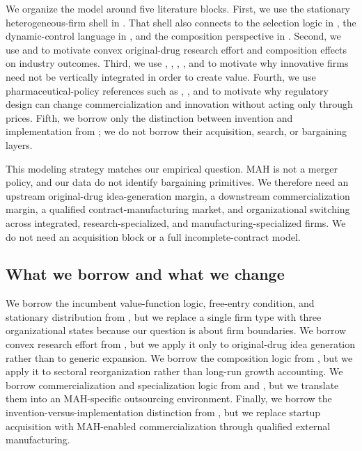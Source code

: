 \documentclass[12pt]{article}
\newcommand{\1}{\mathbf{1}}
\begin{document}
We organize the model around five literature blocks. First, we use the stationary heterogeneous-firm shell in \citet{Hopenhayn1992}. That shell also connects to the selection logic in \citet{Jovanovic1982}, the dynamic-control language in \citet{EricsonPakes1995}, and the composition perspective in \citet{Luttmer2007}. Second, we use \citet{KletteKortum2004} and \citet{AkcigitKerr2018} to motivate convex original-drug research effort and composition effects on industry outcomes. Third, we use \citet{AroraFosfuriGambardella2001}, \citet{AroraMerges2004}, \citet{GansStern2000}, \citet{GansStern2003}, and \citet{GansHsuStern2008} to motivate why innovative firms need not be vertically integrated in order to create value. Fourth, we use pharmaceutical-policy references such as \citet{Lakdawalla2018}, \citet{ChandraEtAl2026}, and \citet{JiaMaYangZhang2023} to motivate why regulatory design can change commercialization and innovation without acting only through prices. Fifth, we borrow only the distinction between invention and implementation from \citet{FonsRosenRoldanBlancoSchmitz2026}; we do not borrow their acquisition, search, or bargaining layers.

This modeling strategy matches our empirical question. MAH is not a merger policy, and our data do not identify bargaining primitives. We therefore need an upstream original-drug idea-generation margin, a downstream commercialization margin, a qualified contract-manufacturing market, and organizational switching across integrated, research-specialized, and manufacturing-specialized firms. We do not need an acquisition block or a full incomplete-contract model.

\subsection{What we borrow and what we change}

We borrow the incumbent value-function logic, free-entry condition, and stationary distribution from \citet{Hopenhayn1992}, but we replace a single firm type with three organizational states because our question is about firm boundaries. We borrow convex research effort from \citet{KletteKortum2004}, but we apply it only to original-drug idea generation rather than to generic expansion. We borrow the composition logic from \citet{AkcigitKerr2018}, but we apply it to sectoral reorganization rather than long-run growth accounting. We borrow commercialization and specialization logic from \citet{AroraMerges2004} and \citet{GansStern2003}, but we translate them into an MAH-specific outsourcing environment. Finally, we borrow the invention-versus-implementation distinction from \citet{FonsRosenRoldanBlancoSchmitz2026}, but we replace startup acquisition with MAH-enabled commercialization through qualified external manufacturing.
\end{document}
